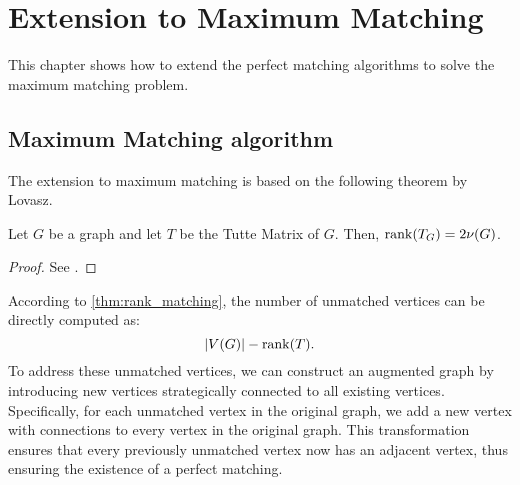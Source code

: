 \chapter{Extension to Maximum Matching}
\label{chap:maximum_matching}

This chapter shows how to extend the perfect matching algorithms to solve the maximum matching problem.

\section{Maximum Matching algorithm}

The extension to maximum matching is based on the following theorem by Lovasz.
\begin{theorem}
\label{thm:rank_matching}
    Let \(G\) be a graph and let \(T\) be the Tutte Matrix of \(G\).
    Then, \(\operatorname{rank}(T_G) = 2\nu(G)\).
\end{theorem}

\begin{proof}
  See \citet[p.~560]{Rabin1989}.
\end{proof}

According to \cref{thm:rank_matching}, the number of unmatched vertices can be directly computed as:
\[
    |V(G)| - \operatorname{rank}(T).
\]
To address these unmatched vertices, we can construct an augmented graph by introducing new vertices strategically connected to all existing vertices. 
Specifically, for each unmatched vertex in the original graph, we add a new vertex with connections to every vertex in the original graph. 
This transformation ensures that every previously unmatched vertex now has an adjacent vertex, thus ensuring the existence of a perfect matching.

